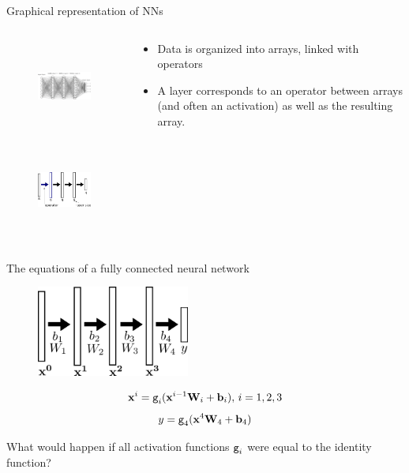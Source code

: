 \documentclass[handout,xcolor=pdftex,dvipsnames,table,mathserif]{beamer}
\begin{document}
\begin{frame}{Graphical representation of NNs}

\begin{columns}
  \begin{column}{.5\textwidth}
    \begin{figure}
      \includegraphics[height=3cm]{network.png}
    \end{figure}
    \begin{figure}
      \includegraphics[height=3cm]{nn_representation}
    \end{figure}
  \end{column}

  \begin{column}{.5\textwidth}
    \begin{itemize}
    \item Data is organized into arrays, linked with operators
    \item A layer corresponds to an operator between arrays (and often an activation) as well as the resulting array.
    \end{itemize}
  \end{column}
\end{columns}


\end{frame}


\begin{frame}{The equations of a fully connected neural network}

    \begin{figure}
      \includegraphics[height=3cm]{nn_representation2}
    \end{figure}

    \begin{block}{}
      \[\mathbf{x}^i = \texttt{g}_i(\mathbf{x}^{i-1}\mathbf{W}_i + \mathbf{b}_i),\, i= 1, 2, 3 \]
      \[y = \texttt{g}_4(\mathbf{x}^4\mathbf{W}_4 + \mathbf{b}_4)\]
    \end{block}

    \pause

    What would happen if all activation functions $\texttt{g}_i$ were equal to the identity function?

\end{frame}
\end{document}
